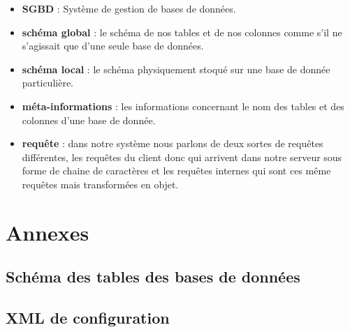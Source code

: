 \documentclass[12pt]{article}
\begin{document}
	\begin{itemize}
		\item \textbf{SGBD} : Système de gestion de bases de données.\\
		\item \textbf{schéma global} : le schéma de nos tables et de nos colonnes comme s'il ne s'agissait que d'une seule base de données.\\
		\item \textbf{schéma local} : le schéma physiquement stoqué sur une base de donnée particulière.\\
		\item \textbf{méta-informations} : les informations concernant le nom des tables et des colonnes d'une base de donnée.\\
		\item \textbf{requête} : dans notre système nous parlons de deux sortes de requêtes différentes, les requêtes du client donc qui arrivent dans notre serveur sous forme de chaine de caractères et les requêtes internes qui sont ces même requêtes mais transformées en objet.\\
	\end{itemize}
\newpage
\section{Annexes}

\subsection{Schéma des tables des bases de données}

\subsection{XML de configuration}
\end{document}
